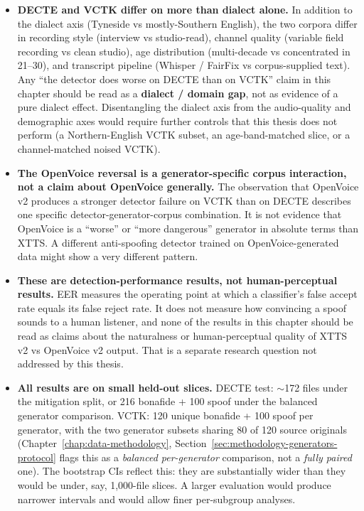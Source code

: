 \begin{itemize}
    \item \textbf{DECTE and VCTK differ on more than dialect alone.} In
        addition to the dialect axis (Tyneside vs mostly-Southern
        English), the two corpora differ in recording style (interview
        vs studio-read), channel quality (variable field recording vs
        clean studio), age distribution (multi-decade vs concentrated
        in 21--30), and transcript pipeline (Whisper / FairFix vs
        corpus-supplied text). Any ``the detector does worse on DECTE
        than on VCTK'' claim in this chapter should be read as a
        \textbf{dialect / domain gap}, not as evidence of a pure dialect
        effect. Disentangling the dialect axis from the audio-quality
        and demographic axes would require further controls that this
        thesis does not perform (a Northern-English VCTK subset, an
        age-band-matched slice, or a channel-matched noised VCTK).
    \item \textbf{The OpenVoice reversal is a generator-specific corpus
        interaction, not a claim about OpenVoice generally.} The
        observation that OpenVoice v2 produces a stronger detector
        failure on VCTK than on DECTE describes one specific
        detector-generator-corpus combination. It is not evidence that
        OpenVoice is a ``worse'' or ``more dangerous'' generator in
        absolute terms than XTTS. A different anti-spoofing detector
        trained on OpenVoice-generated data might show a very different
        pattern.
    \item \textbf{These are detection-performance results, not human-perceptual
        results.} EER measures the operating point at which a
        classifier's false accept rate equals its false reject rate. It
        does not measure how convincing a spoof sounds to a human
        listener, and none of the results in this chapter should be
        read as claims about the naturalness or human-perceptual quality
        of XTTS v2 vs OpenVoice v2 output. That is a separate research
        question not addressed by this thesis.
    \item \textbf{All results are on small held-out slices.} DECTE test:
        $\sim$172 files under the mitigation split, or 216 bonafide + 100
        spoof under the balanced generator comparison. VCTK: 120 unique
        bonafide + 100 spoof per generator, with the two generator
        subsets sharing 80 of 120 source originals (Chapter~\ref{chap:data-methodology}, Section~\ref{sec:methodology-generators-protocol}
        flags this as a \emph{balanced per-generator} comparison, not
        a \emph{fully paired} one). The bootstrap CIs reflect this: they are
        substantially wider than they would be under, say, 1,000-file
        slices. A larger evaluation would produce narrower intervals
        and would allow finer per-subgroup analyses.
\end{itemize}

